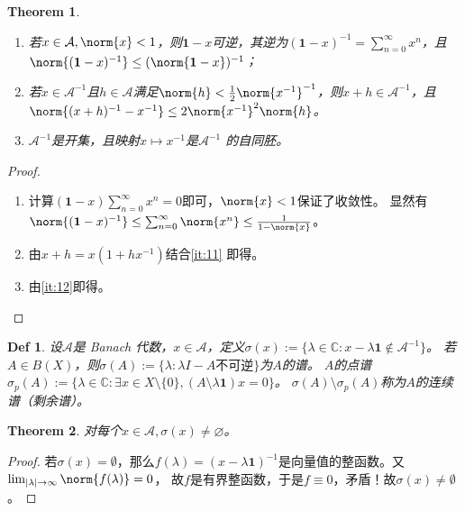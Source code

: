 \documentclass{ctexart}
\newtheorem{definition}{Def}
\newtheorem{theorem}{Theorem}
\begin{document}
\begin{theorem}\label{the:1}
  \begin{enumerate}
    \item \label{it:11} 若\(x \in \mathcal{A},\norm{x} < 1 \)，则\(\mathbf{1} -x \)可逆，其逆为\((\mathbf{1}-x)^{-1} = \sum_{n = 0}^{\infty}x^n \)，且
      \(\norm{(\mathbf{1}- x)^{-1}} \leq (\norm{\mathbf{1} - x})^{-1} \)；
    \item \label{it:12} 若\(x \in \mathcal{A}^{-1} \)且\(h \in \mathcal{A} \)满足\(\norm{h}<\frac{1}{2} \norm{x^{-1}}^{-1} \)，则\(x + h \in \mathcal{A}^{-1} \)，且
      \(\norm{(x + h)^{-1} - x^{-1}} \leq 2\norm{x^{-1}}^2 \norm{h} \)。
    \item \(\mathcal{A}^{-1} \)是开集，且映射\(x \mapsto x^{-1} \)是\(\mathcal{A}^{-1} \) 的自同胚。
  \end{enumerate}
\end{theorem}
\begin{proof}
  \begin{enumerate}
    \item 计算\((\mathbf{1}- x) \sum_{n = 0}^{\infty}x^n=0 \)即可，\(\norm{x} < 1 \)保证了收敛性。
      显然有\(\norm{( \mathbf{1}-x )^{-1}} \leq \sum_{n = 0}^{\infty}\norm{x^n} \leq \frac{1}{1-\norm{x}} \)。
    \item 由\(x+h = x(1+hx^{-1}) \)结合\ref{it:11} 即得。
    \item 由\ref{it:12}即得。
  \end{enumerate}

\end{proof}

\begin{definition}\label{def:shc}
  设\(\mathcal{A} \)是 Banach 代数，\(x \in \mathcal{A} \)，定义\(\sigma(x):= \{\lambda \in \mathbb{C}:x - \lambda \mathbf{1} \notin \mathcal{A}^{-1}\} \)。
  若\(A \in B(X)\)，则\(\sigma(A):=\{\lambda:\lambda I - A \text{不可逆}\} \)为\(A \)的谱。
  \(A \)的点谱\(\sigma_p(A):= \{\lambda \in \mathbb{C}: \exists x \in X \setminus \{0\},(A\setminus \lambda \mathbf{1})x = 0\} \)。
  \(\sigma(A)\setminus \sigma_p(A) \)称为\(A \)的连续谱（剩余谱）。
\end{definition}

\begin{theorem}\label{the:shc_nonempty}
  对每个\(x \in \mathcal{A},\sigma(x)\neq \varnothing \)。
\end{theorem}
\begin{proof}
  若\(\sigma(x)= \emptyset \)，那么\(f(\lambda) = (x - \lambda \mathbf{1})^{-1} \)是向量值的整函数。又\(\lim_{|\lambda| \to \infty}\norm{f(\lambda)} = 0 \)，
  故\(f \)是有界整函数，于是\(f \equiv 0 \)，矛盾！故\(\sigma(x) \neq \emptyset \)。
\end{proof}
\end{document}
